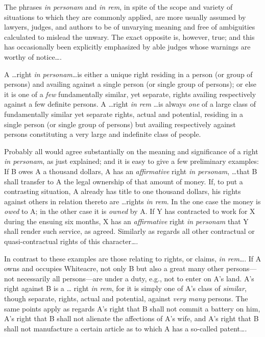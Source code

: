 


The phrases \textit{in personam} and \textit{in rem}, in spite of the scope and
variety of situations to which they are commonly applied, are more usually
assumed by lawyers, judges, and authors to be of unvarying meaning and free of
ambiguities calculated to mislead the unwary. The exact opposite is, however,
true; and this has occasionally been explicitly emphasized by able judges whose
warnings are worthy of notice\ldots.

A \ldots right \textit{in personam}\ldots is either a unique right residing
in a person (or group of persons) and availing against a single person (or
single group of persons); or else it is one of a \textit{few} fundamentally
similar, yet separate, rights availing respectively against a few definite
persons. A \ldots right \textit{in rem} \ldots is always \textit{one} of a
large class of fundamentally similar yet separate rights, actual and potential,
residing in a single person (or single group of persons) but availing
respectively against persons constituting a very large and indefinite class of
people.

Probably all would agree substantially on the meaning and significance of a
right \textit{in personam}, as just explained; and it is easy to give a few
preliminary examples: If B owes A a thousand dollars, A has an
\textit{affirmative} right \textit{in personam}, \ldots that B shall transfer
to A the legal ownership of that amount of money. If, to put a contrasting
situation, A already has title to one thousand dollars, his rights against
others in relation thereto are \ldots rights \textit{in rem}. In the one case
the money is \textit{owed} to A; in the other case it is \textit{owned} by A.
If Y has contracted to work for X during the ensuing six months, X has an
\textit{affirmative} right \textit{in personam} that Y shall render such
service, as agreed. Similarly as regards all other contractual or
quasi-contractual rights of this character\ldots.

In contrast to these examples are those relating to rights, or claims,
\textit{in rem}\ldots. If A owns and occupies Whiteacre, not
only B but also a great many other persons---not necessarily all persons---are
under a duty, e.g., not to enter on A's land. A's right against B is a \ldots
right \textit{in rem}, for it is simply one of A's class of \textit{similar},
though separate, rights, actual and potential, against \textit{very many}
persons. The same points apply as regards A's right that B shall not commit a
battery on him, A's right that B shall not alienate the affections of A's wife,
and A's right that B shall not manufacture a certain article as to which A has
a so-called patent\ldots.

